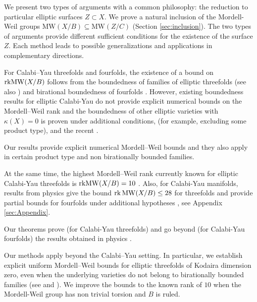 \documentclass[11pt]{amsart}
\theoremstyle{definition}
\theoremstyle{definition}
\theoremstyle{remark}
\theoremstyle{remark}
\theoremstyle{definition}
\theoremstyle{conjecture}
\newcommand{\MW}{\mathrm{MW}}
\begin{document}
We present  two types of arguments with a common philosophy: the reduction to particular elliptic surfaces $Z \subset X$.   
We  prove a natural inclusion of the Mordell-Weil groups
$\MW(X/B) \subseteq \MW(Z/C)$
(Section \ref{sec:inclusion}). 
The two types of arguments provide different sufficient conditions  for the existence of  the surface $Z$. 
  Each method leads to possible generalizations  and applications in complementary directions.  
\color{black}



For Calabi{--}Yau threefolds and fourfolds, the existence of a bound on ${\rm rk}\MW(X/B)$  follows from the boundedness of families of elliptic threefolds \cite{Filipazzi:2021dcw} (see also \cite{Gross1994}) and birational boundedness of fourfolds \cite{engel2025boundednessfiberedktrivialvarieties}.  
 However, existing boundedness results for elliptic Calabi-Yau do not provide explicit numerical bounds on the Mordell{--}Weil rank and the  boundedness  of other elliptic varieties with $\kappa(X)=0$  is proven under additional conditions, (for example, excluding  some product type),  \cite{Birkar_2024, DiCerboSvaldi, Filipazzi:2021dcw, Gross1994} and the  recent \cite{FilipazziXu2026boundednessellipticcalabiyau4folds}. 
 


 Our  results  provide explicit numerical Mordell{--}Weil bounds and they also apply in certain product type and non birationally bounded families.



 
 At the same time, the highest Mordell{--}Weil rank currently known for elliptic Calabi-Yau threefolds is ${\rm rk}\MW(X/B) = 10$ 
 \cite{Grassi:2021wii,Elkies}. Also, for  Calabi-Yau manifolds, results from physics give the bound $\mathrm{rk}\,{\rm MW} (X/B)\le 28$ for threefolds and provide partial bounds for fourfolds under additional hypotheses \cite{Lee:2019skh,Martucci:2022krl,Lee:2022swr}, see Appendix \ref{sec:Appendix}.
 

 
Our theorems  prove (for Calabi-Yau threefolds)  and go beyond (for Calabi-Yau fourfolds) the  results obtained in  physics  \cite{Lee:2019skh,Martucci:2022krl,Lee:2022swr}.




Our methods apply beyond the Calabi{--}Yau setting. In particular, we establish explicit uniform Mordell{--}Weil bounds for elliptic threefolds of Kodaira dimension zero, even when the underlying varieties do not belong to birationally bounded families (see \cite{DiCerboSvaldi} and \cite{Birkar_2024}).
We improve the bounds to the known rank of $10$ when the Mordell-Weil group has non trivial torsion and $B$ is ruled.
\end{document}
